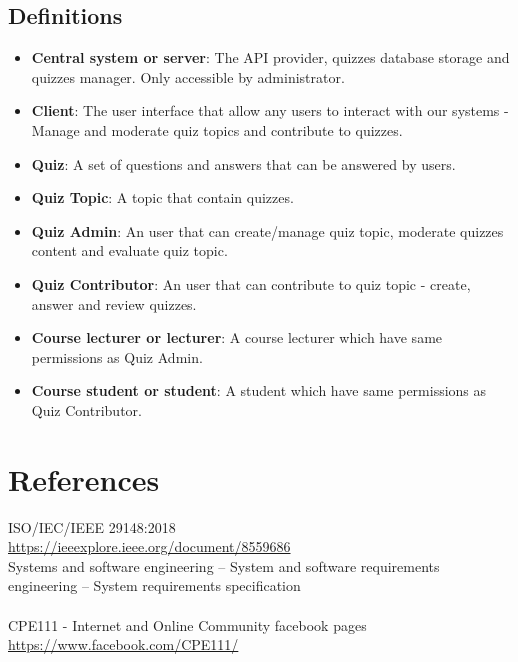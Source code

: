 \documentclass[ 10pt]{report}
\begin{document}
        \subsection{Definitions}
        \begin{itemize}
            \item \textbf{Central system or server}: The API provider, quizzes database storage and quizzes manager. Only accessible by administrator.
            \item \textbf{Client}: The user interface that allow any users to interact with our systems - Manage and moderate quiz topics and contribute to quizzes.
            \item \textbf{Quiz}: A set of questions and answers that can be answered by users.
            \item \textbf{Quiz Topic}: A topic that contain quizzes.
            \item \textbf{Quiz Admin}: An user that can create/manage quiz topic, moderate quizzes content and evaluate quiz topic.
            \item \textbf{Quiz Contributor}: An user that can contribute to quiz topic - create, answer and review quizzes.
            \item \textbf{Course lecturer or lecturer}: A course lecturer which have same permissions as Quiz Admin.
            \item \textbf{Course student or student}: A student which have same permissions as Quiz Contributor.
        \end{itemize}
    \pagebreak

    \section{References}
    \noindent ISO/IEC/IEEE 29148:2018 \\
    \href{https://ieeexplore.ieee.org/document/8559686}{https://ieeexplore.ieee.org/document/8559686} \\
    Systems and software engineering -- System and software requirements engineering -- System requirements specification \\\\

    \noindent CPE111 - Internet and Online Community facebook pages \\
    \href{https://www.facebook.com/CPE111/}{https://www.facebook.com/CPE111/} \\\\
\end{document}

